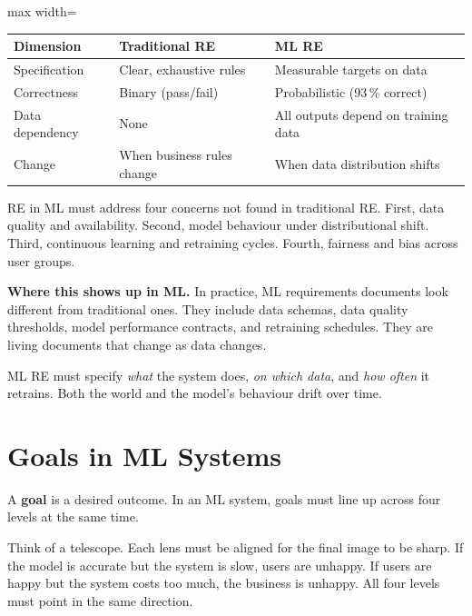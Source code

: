 \documentclass[a4paper,11pt]{article}
\newcommand{\vocab}[1]{\textbf{\color{navy}#1}}
\begin{document}
\begin{center}
\begin{adjustbox}{max width=\linewidth}
\begin{tabular}{@{}lll@{}}
\toprule
\textbf{Dimension} & \textbf{Traditional RE} & \textbf{ML RE} \\
\midrule
Specification & Clear, exhaustive rules & Measurable targets on data \\
Correctness & Binary (pass/fail) & Probabilistic (93\,\% correct) \\
Data dependency & None & All outputs depend on training data \\
Change & When business rules change & When data distribution shifts \\
\bottomrule
\end{tabular}
\end{adjustbox}
\end{center}

RE in ML must address four concerns not found in traditional RE.
First, data quality and availability.
Second, model behaviour under distributional shift.
Third, continuous learning and retraining cycles.
Fourth, fairness and bias across user groups.

\noindent\textbf{Where this shows up in ML.}
In practice, ML requirements documents look different from traditional ones.
They include data schemas, data quality thresholds, model performance contracts,
and retraining schedules.
They are living documents that change as data changes.

\begin{keytake}
ML RE must specify \emph{what} the system does, \emph{on which data},
and \emph{how often} it retrains.
Both the world and the model's behaviour drift over time.
\end{keytake}

\section{Goals in ML Systems}

A \vocab{goal} is a desired outcome.
In an ML system, goals must line up across four levels at the same time.

\begin{intuition}
Think of a telescope.
Each lens must be aligned for the final image to be sharp.
If the model is accurate but the system is slow, users are unhappy.
If users are happy but the system costs too much, the business is unhappy.
All four levels must point in the same direction.
\end{intuition}
\end{document}
